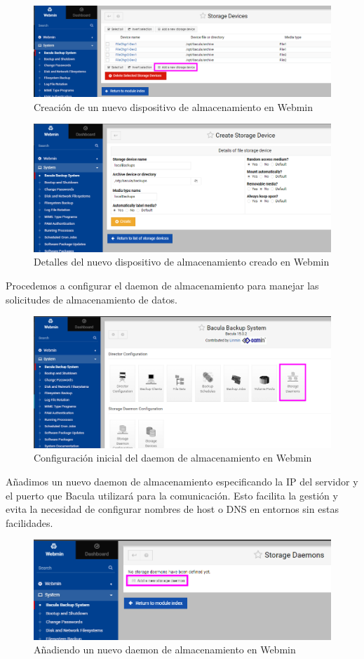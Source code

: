 \begin{figure}[H]
    \centering
    \includegraphics[width=0.5\linewidth]{instalacionBacula/NSD.png}
    \caption{Creación de un nuevo dispositivo de almacenamiento en Webmin}
\end{figure}
\begin{figure}[H]
    \centering
    \includegraphics[width=0.5\linewidth]{instalacionBacula/localbac.png}
    \caption{Detalles del nuevo dispositivo de almacenamiento creado en Webmin}
\end{figure}

Procedemos a configurar el daemon de almacenamiento para manejar las solicitudes de almacenamiento de datos.

\begin{figure}[H]
    \centering
    \includegraphics[width=0.5\linewidth]{instalacionBacula/stdeamon.png}
    \caption{Configuración inicial del daemon de almacenamiento en Webmin}
\end{figure}

Añadimos un nuevo daemon de almacenamiento especificando la IP del servidor y el puerto que Bacula utilizará para la comunicación. Esto facilita la gestión y evita la necesidad de configurar nombres de host o DNS en entornos sin estas facilidades.

\begin{figure}[H]
    \centering
    \includegraphics[width=0.5\linewidth]{instalacionBacula/newsd.png}
    \caption{Añadiendo un nuevo daemon de almacenamiento en Webmin}
\end{figure}


